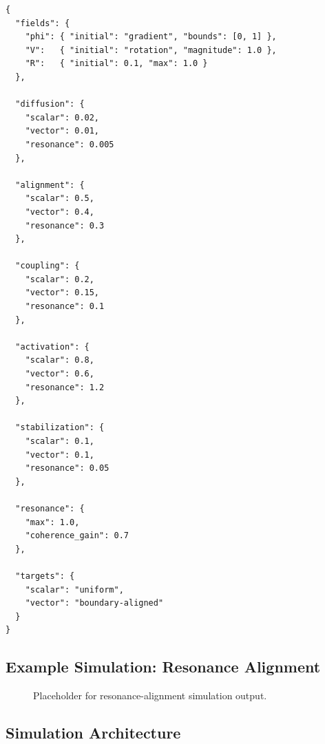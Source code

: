 \documentclass[12pt]{article}
\begin{document}
\begin{verbatim}
{
  "fields": {
    "phi": { "initial": "gradient", "bounds": [0, 1] },
    "V":   { "initial": "rotation", "magnitude": 1.0 },
    "R":   { "initial": 0.1, "max": 1.0 }
  },

  "diffusion": {
    "scalar": 0.02,
    "vector": 0.01,
    "resonance": 0.005
  },

  "alignment": {
    "scalar": 0.5,
    "vector": 0.4,
    "resonance": 0.3
  },

  "coupling": {
    "scalar": 0.2,
    "vector": 0.15,
    "resonance": 0.1
  },

  "activation": {
    "scalar": 0.8,
    "vector": 0.6,
    "resonance": 1.2
  },

  "stabilization": {
    "scalar": 0.1,
    "vector": 0.1,
    "resonance": 0.05
  },

  "resonance": {
    "max": 1.0,
    "coherence_gain": 0.7
  },

  "targets": {
    "scalar": "uniform",
    "vector": "boundary-aligned"
  }
}
\end{verbatim}

\subsection{Example Simulation: Resonance Alignment}

\begin{figure}[h]
\centering
{}
\caption{Placeholder for resonance-alignment simulation output.}
\label{fig:sim-placeholder}
\end{figure}

\subsection{Simulation Architecture}
\end{document}
